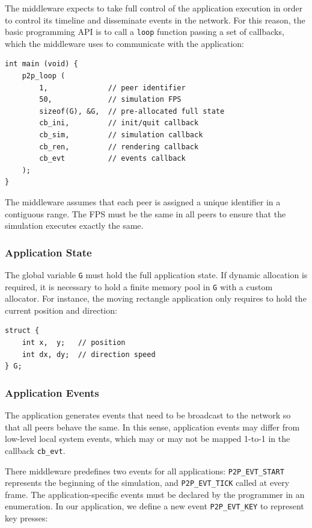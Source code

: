 \documentclass[10pt,journal,compsoc]{IEEEtran}
\newcommand{\code}[1]  {\texttt{\footnotesize{#1}}}
\begin{document}
The middleware expects to take full control of the application execution in
order to control its timeline and disseminate events in the network.
For this reason, the basic programming API is to call a \code{loop} function
passing a set of callbacks, which the middleware uses to communicate with the
application:

{\footnotesize
\begin{verbatim}
int main (void) {
    p2p_loop (
        1,              // peer identifier
        50,             // simulation FPS
        sizeof(G), &G,  // pre-allocated full state
        cb_ini,         // init/quit callback
        cb_sim,         // simulation callback
        cb_ren,         // rendering callback
        cb_evt          // events callback
    );
}
\end{verbatim}
}

The middleware assumes that each peer is assigned a unique identifier in a
contiguous range.
The FPS must be the same in all peers to ensure that the simulation executes
exactly the same.

\subsubsection{Application State}

The global variable \code{G} must hold the full application state.
If dynamic allocation is required, it is necessary to hold a finite memory
pool in \code{G} with a custom allocator.
For instance, the moving rectangle application only requires to hold the
current position and direction:

{\footnotesize
\begin{verbatim}
struct {
    int x,  y;   // position
    int dx, dy;  // direction speed
} G;
\end{verbatim}
}

\subsubsection{Application Events}

The application generates events that need to be broadcast to the network so
that all peers behave the same.
In this sense, application events may differ from low-level local system
events, which may or may not be mapped 1-to-1 in the callback \code{cb\_evt}.

There middleware predefines two events for all applications:
    \code{P2P\_EVT\_START} represents the beginning of the simulation, and
    \code{P2P\_EVT\_TICK} called at every frame.
The application-specific events must be declared by the programmer in an
enumeration.
In our application, we define a new event \code{P2P\_EVT\_KEY} to represent key
presses:
\end{document}
